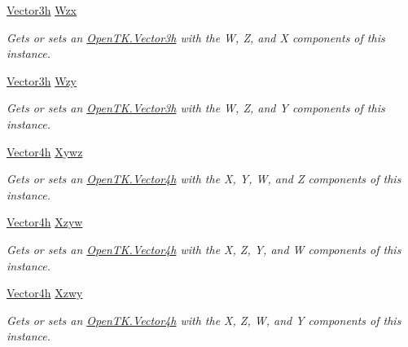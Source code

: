 \begin{DoxyCompactItemize}
\hyperlink{struct_open_t_k_1_1_vector3h}{Vector3h} \hyperlink{struct_open_t_k_1_1_vector4h_a7474b28d9ac6ea7e866e683379a7950b}{Wzx}
\begin{DoxyCompactList}\small\item\em Gets or sets an \hyperlink{struct_open_t_k_1_1_vector3h}{Open\-T\-K.\-Vector3h} with the W, Z, and X components of this instance. \end{DoxyCompactList}\item 
\hyperlink{struct_open_t_k_1_1_vector3h}{Vector3h} \hyperlink{struct_open_t_k_1_1_vector4h_a8ac48437afbd0cdda817f67ae58a9428}{Wzy}
\begin{DoxyCompactList}\small\item\em Gets or sets an \hyperlink{struct_open_t_k_1_1_vector3h}{Open\-T\-K.\-Vector3h} with the W, Z, and Y components of this instance. \end{DoxyCompactList}\item 
\hyperlink{struct_open_t_k_1_1_vector4h}{Vector4h} \hyperlink{struct_open_t_k_1_1_vector4h_abd906c0858b365e57aa80a1a334a9776}{Xywz}
\begin{DoxyCompactList}\small\item\em Gets or sets an \hyperlink{struct_open_t_k_1_1_vector4h}{Open\-T\-K.\-Vector4h} with the X, Y, W, and Z components of this instance. \end{DoxyCompactList}\item 
\hyperlink{struct_open_t_k_1_1_vector4h}{Vector4h} \hyperlink{struct_open_t_k_1_1_vector4h_a51c923d27671819c6894e0f93e6e4c82}{Xzyw}
\begin{DoxyCompactList}\small\item\em Gets or sets an \hyperlink{struct_open_t_k_1_1_vector4h}{Open\-T\-K.\-Vector4h} with the X, Z, Y, and W components of this instance. \end{DoxyCompactList}\item 
\hyperlink{struct_open_t_k_1_1_vector4h}{Vector4h} \hyperlink{struct_open_t_k_1_1_vector4h_aee741f57d4b2084b48a3e7cf112d8e48}{Xzwy}
\begin{DoxyCompactList}\small\item\em Gets or sets an \hyperlink{struct_open_t_k_1_1_vector4h}{Open\-T\-K.\-Vector4h} with the X, Z, W, and Y components of this instance. \end{DoxyCompactList}\item 

\end{DoxyCompactItemize}
